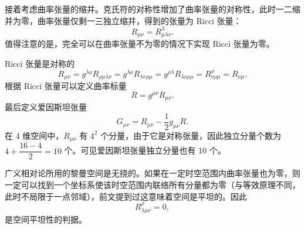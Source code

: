 \documentclass[UTF8, 12pt, a4paper, oneside, onecolumn, fontset=none]{ctexart}
\begin{document}
接着考虑曲率张量的缩并。克氏符的对称性增加了曲率张量的对称性，此时一二缩并为零，曲率张量仅剩一三独立缩并，得到的张量为 Ricci 张量：
\begin{equation}
R_{\mu\nu}=R^{\lambda}_{\mu\lambda\nu}.
\end{equation}
值得注意的是，完全可以在曲率张量不为零的情况下实现 Ricci 张量为零。

Ricci 张量是对称的
\begin{equation}
R_{\mu\nu}=g^{\lambda\rho}R_{\rho\mu\lambda\nu}=g^{\lambda\rho}R_{\lambda\nu\rho\mu}=g^{\rho\lambda}R_{\lambda\nu\rho\mu}=R^{\rho}_{\nu\rho\mu}=R_{\nu\mu}.
\end{equation}
根据 Ricci 张量可以定义曲率标量
\begin{equation}
R=g^{\mu\nu}R_{\mu\nu}.
\end{equation}
最后定义爱因斯坦张量
\begin{equation}
G_{\mu\nu}=R_{\mu\nu}-\frac{1}{2}g_{\mu\nu}R.
\end{equation}
在 4 维空间中，$R_{\mu\nu}$ 有 $4^{2}$ 个分量，由于它是对称张量，因此独立分量个数为 $4+\dfrac{16-4}{2}=10$ 个。可见爱因斯坦张量独立分量也有 10 个。

广义相对论所用的黎曼空间是无挠的。如果在一定时空范围内曲率张量也为零，则一定可以找到一个坐标系使该时空范围内联络所有分量都为零（与等效原理不同，此时不局限于一点邻域），前文提到过这意味着空间是平坦的。因此
\begin{equation}
R_{\lambda\mu\nu}^{\rho}=0,
\end{equation}
是空间平坦性的判据。
\end{document}
